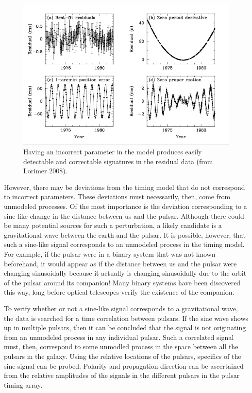 \documentclass[12pt]{article}
\begin{document}
\begin{figure}
\caption{Having an incorrect parameter in the model produces easily detectable
and correctable signatures in the residual data (from Lorimer 2008).}
\includegraphics[width=\textwidth]{./figures/bad_timing.png}
\end{figure}


However, there may be deviations from the timing model that do not correspond to
incorrect parameters. These deviations must necessarily, then, come from
unmodeled processes. Of the most importance is the deviation corresponding to a
sine-like change in the distance between us and the pulsar. Although there could
be many potential sources for such a perturbation, a likely candidate is a
gravitational wave between the earth and the pulsar. It is possible, however,
that such a sine-like signal corresponds to an unmodeled process in the timing
model. For example, if the pulsar were in a binary system that was not known
beforehand, it would appear as if the distance between us and the pulsar were
changing sinusoidally because it actually is changing sinusoidally due to the
orbit of the pulsar around its companion! Many binary systems have been
discovered this way, long before optical telescopes verify the existence of
the companion.

To verify whether or not a sine-like signal corresponds to a gravitational wave,
the data is searched for a time correlation between pulsars. If the sine wave
shows up in multiple pulsars, then it can be concluded that the signal is not
originating from an unmodeled process in any individual pulsar. Such a
correlated signal must, then, correspond to some unmodled process in the space
between all the pulsars in the galaxy. Using the relative locations of the
pulsars, specifics of the sine signal can be probed. Polarity and propagation
direction can be ascertained from the relative amplitudes of the signals in the
different pulsars in the pulsar timing array.
\end{document}
